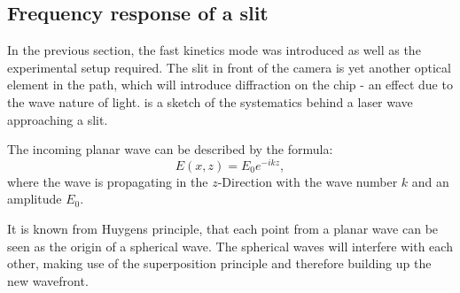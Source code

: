 \subsection{Frequency response of a slit}
\label{subsec:slit}

In the previous section, the fast kinetics mode was introduced as well as the experimental setup required. The slit in front of the camera is yet another optical element in the path, which will introduce diffraction on the chip - an effect due to the wave nature of light.
 is a sketch of the systematics behind a laser wave approaching a slit.


The incoming planar wave can be described by the formula:
\begin{equation}
E(x,z) = E_0 e^{-ikz},
\end{equation}
where the wave is propagating in the $z$-Direction with the wave number $k$ and an amplitude $E_0$.

It is known from Huygens principle, that each point from a planar wave can be seen as the origin of a spherical wave. The spherical waves will interfere with each other, making use of the superposition principle and therefore building up the new wavefront.

